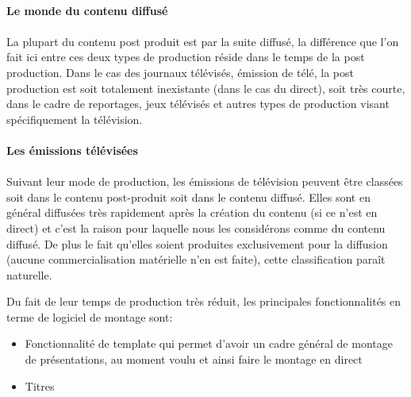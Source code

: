 \paragraph{Le monde du contenu diffusé}

\paragraph{}


La plupart du contenu post produit est par la suite diffusé, la
différence que l'on fait ici entre ces deux types de production
réside dans le temps de la post production.  Dans le cas des journaux
télévisés, émission de télé, la post production est soit totalement
inexistante (dans le cas du direct), soit très courte, dans le cadre
de reportages, jeux télévisés et autres types de production visant
spécifiquement la télévision.

\paragraph {Les émissions télévisées}

\paragraph{}

Suivant leur mode de production, les émissions de télévision peuvent
être classées soit dans le contenu post-produit soit dans le contenu
diffusé. Elles sont en général diffusées très rapidement après la
création du contenu (si ce n'est en direct) et c'est la raison pour
laquelle nous les considérons comme du contenu diffusé. De plus le
fait qu'elles soient produites exclusivement pour la diffusion (aucune
commercialisation matérielle n'en est faite), cette classification
paraît naturelle.

Du fait de leur temps de production très réduit, les principales
fonctionnalités en terme de logiciel de montage sont:

\begin{itemize} \setlength{\itemsep}{2mm}

  \item{Fonctionnalité de template qui permet d'avoir un cadre général
    de montage de présentations, au moment voulu et ainsi faire le
    montage en direct}

  \item{Titres}

\end{itemize}

